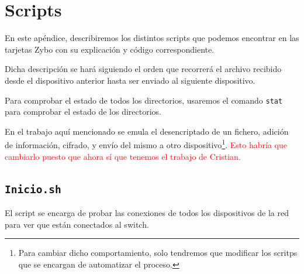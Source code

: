 \chapter{Scripts}
\hypertarget{Scripts}{}
En este apéndice, describiremos los distintos scripts que podemos encontrar en las tarjetas Zybo con su explicación y código correspondiente.

Dicha descripción se hará siguiendo el orden que recorrerá el archivo recibido desde el dispositivo anterior hasta ser enviado al siguiente dispositivo.

Para comprobar el estado de todos los directorios, usaremos el comando \texttt{stat} para comprobar el estado de los directorios.

En el trabajo aquí mencionado se emula el desencriptado de un fichero, adición de información, cifrado, y envío del mismo a otro dispositivo\footnote{Para cambiar dicho comportamiento, solo tendremos que modificar los scritps que se encargan de automatizar el proceso.}. \textcolor{red}{Esto habría que cambiarlo puesto que ahora sí que tenemos el trabajo de Cristian.}

\newpage
\section{\texttt{Inicio.sh}}
\hypertarget{ScriptConexion}{}
El script se encarga de probar las conexiones de todos los dispositivos de la red para ver que están conectados al switch.

